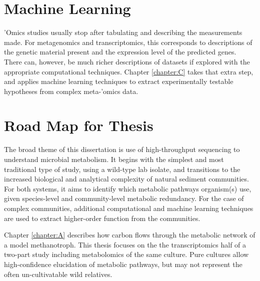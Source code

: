 \section{Machine Learning}
'Omics studies usually stop after tabulating and describing the measurements made.
For metagenomics and transcriptomics, this corresponds to descriptions of the genetic material present and the expression level of the predicted genes.
There can, however, be much richer descriptions of datasets if explored with the appropriate computational techniques.
Chapter \ref{chapter:C} takes that extra step, and applies machine learning techniques to extract experimentally testable hypotheses from complex meta-'omics data.


\section{Road Map for Thesis} %
The broad theme of this dissertation is use of high-throughput sequencing to understand microbial metabolism.
It begins with the simplest and most traditional type of study, using a wild-type lab isolate, and transitions to the increased biological and analytical complexity of natural sediment communities.
For both systems, it aims to identify which metabolic pathways organism(s) use, given species-level and community-level metabolic redundancy.
For the case of complex communities, additional computational and machine learning techniques are used to extract higher-order function from the communities.

Chapter \ref{chapter:A} describes how carbon flows through the metabolic network of a model methanotroph.
This thesis focuses on the the transcriptomics half \cite{matsenOB3b} of a two-part study including metabolomics \cite{yangOB3b} of the same culture.
Pure cultures allow high-confidence elucidation of metabolic pathways, but may not represent the often un-cultivatable wild relatives.

